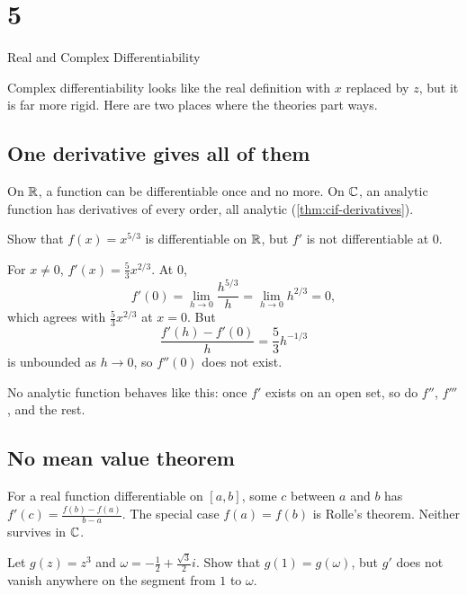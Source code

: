 \chapter{5}{Real and Complex Differentiability}

Complex differentiability looks like the real definition with $x$ replaced by
$z$, but it is far more rigid. Here are two places where the theories part
ways.

\section{One derivative gives all of them}\label{sec:all-derivatives}

On $\mathbb{R}$, a function can be differentiable once and no more. On $\mathbb{C}$, an
analytic function has derivatives of every order, all analytic
(\cref{thm:cif-derivatives}).

\begin{exercise}\label{ex:x-five-thirds}
  Show that $f(x) = x^{5/3}$ is differentiable on $\mathbb{R}$, but $f'$ is not
  differentiable at $0$.
\end{exercise}

\begin{solution}
  For $x \neq 0$, $f'(x) = \frac53 x^{2/3}$. At $0$,
  \[
    f'(0) = \lim_{h \to 0} \frac{h^{5/3}}{h} = \lim_{h \to 0} h^{2/3} = 0,
  \]
  which agrees with $\frac53 x^{2/3}$ at $x = 0$. But
  \[
    \frac{f'(h) - f'(0)}{h} = \frac53 h^{-1/3}
  \]
  is unbounded as $h \to 0$, so $f''(0)$ does not exist.
\end{solution}

\begin{remark}
  No analytic function behaves like this: once $f'$ exists on an open set,
  so do $f''$, $f'''$, and the rest.
\end{remark}

\section{No mean value theorem}\label{sec:no-mvt}

For a real function differentiable on $[a, b]$, some $c$ between $a$ and $b$
has $f'(c) = \frac{f(b) - f(a)}{b - a}$. The special case $f(a) = f(b)$ is
Rolle's theorem. Neither survives in $\mathbb{C}$.

\begin{exercise}\label{ex:z-cubed-rolle}
  Let $g(z) = z^3$ and $\omega = -\frac12 + \frac{\sqrt3}{2} i$. Show that
  $g(1) = g(\omega)$, but $g'$ does not vanish anywhere on the segment from
  $1$ to $\omega$.
\end{exercise}

